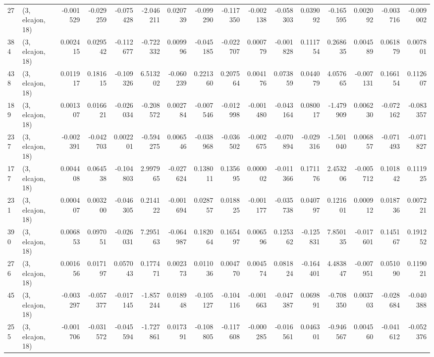 \begin{tabular}{llrrrrrrrrrrrrrr}
27  &  (3, elcajon, 18) &  -0.001529 & -0.029259 & -0.075428 &   -2.046211 &  0.020739 &  -0.099290 & -0.117350 & -0.002138 & -0.058303 &  0.039092 &    -0.165595 &  0.002092 & -0.003716 & -0.009002 \\
384 &  (3, elcajon, 18) &   0.002415 &  0.029542 & -0.112677 &   -0.722332 &  0.009996 &  -0.045185 & -0.022707 &  0.000779 & -0.001828 &  0.111754 &     0.268635 &  0.004589 &  0.061879 &  0.007801 \\
438 &  (3, elcajon, 18) &   0.011917 &  0.181615 & -0.109326 &    6.513202 & -0.060239 &   0.221360 &  0.207564 &  0.004176 &  0.073859 &  0.044079 &     4.057665 & -0.007131 &  0.166154 &  0.112607 \\
189 &  (3, elcajon, 18) &   0.001307 &  0.016621 & -0.026034 &   -0.208572 &  0.002784 &  -0.007546 & -0.012998 & -0.001480 & -0.043164 &  0.080017 &    -1.479909 &  0.006230 & -0.072162 & -0.083357 \\
237 &  (3, elcajon, 18) &  -0.002391 & -0.042703 &  0.002201 &   -0.594275 &  0.006546 &  -0.038968 & -0.036502 & -0.002675 & -0.070894 & -0.029316 &    -1.501040 &  0.006857 & -0.071493 & -0.071827 \\
177 &  (3, elcajon, 18) &   0.004408 &  0.064538 & -0.104803 &    2.997965 & -0.027624 &   0.138011 &  0.135695 &  0.000002 & -0.011366 &  0.171176 &     2.453206 & -0.005712 &  0.101842 &  0.111925 \\
231 &  (3, elcajon, 18) &   0.000407 &  0.003200 & -0.046305 &    0.214122 & -0.001694 &   0.028757 &  0.018825 & -0.001177 & -0.035738 &  0.040797 &     0.121601 &  0.000912 &  0.018736 &  0.007221 \\
390 &  (3, elcajon, 18) &   0.006853 &  0.097051 & -0.026031 &    7.295163 & -0.064987 &   0.182064 &  0.165497 &  0.006596 &  0.125362 & -0.125831 &     7.850135 & -0.017601 &  0.145167 &  0.191252 \\
276 &  (3, elcajon, 18) &   0.001656 &  0.017197 &  0.057043 &    0.177471 &  0.002373 &   0.011036 &  0.004770 &  0.004574 &  0.081824 & -0.164401 &     4.483847 & -0.007951 &  0.051090 &  0.119021 \\
45  &  (3, elcajon, 18) &  -0.003297 & -0.057377 & -0.017145 &   -1.857244 &  0.018948 &  -0.105127 & -0.104116 & -0.001663 & -0.047387 &  0.069891 &    -0.708350 &  0.003703 & -0.028684 & -0.040388 \\
255 &  (3, elcajon, 18) &  -0.001706 & -0.031572 & -0.045594 &   -1.727861 &  0.017391 &  -0.108805 & -0.117608 & -0.000285 & -0.016561 &  0.046301 &    -0.946567 &  0.004560 & -0.041612 & -0.052376 \\

\end{tabular}
